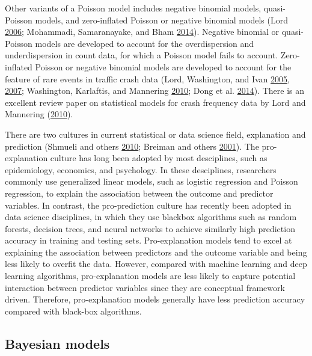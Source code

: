 \documentclass[12pt]{book}
\numberwithin{equation}{chapter}
\begin{document}
Other variants of a Poisson model includes negative binomial models, quasi-Poisson models, and zero-inflated Poisson or negative binomial models (Lord \protect\hyperlink{ref-lord2006modeling}{2006}; Mohammadi, Samaranayake, and Bham \protect\hyperlink{ref-mohammadi2014crash}{2014}). Negative binomial or quasi-Poisson models are developed to account for the overdispersion and underdispersion in count data, for which a Poisson model fails to account. Zero-inflated Poisson or negative binomial models are developed to account for the feature of rare events in traffic crash data (Lord, Washington, and Ivan \protect\hyperlink{ref-lord2005poisson}{2005}, \protect\hyperlink{ref-lord2007further}{2007}; Washington, Karlaftis, and Mannering \protect\hyperlink{ref-washington2010statistical}{2010}; Dong et al. \protect\hyperlink{ref-dong2014multivariate}{2014}). There is an excellent review paper on statistical models for crash frequency data by Lord and Mannering (\protect\hyperlink{ref-lord2010statistical}{2010}).

There are two cultures in current statistical or data science field, explanation and prediction (Shmueli and others \protect\hyperlink{ref-shmueli2010explain}{2010}; Breiman and others \protect\hyperlink{ref-breiman2001statistical}{2001}). The pro-explanation culture has long been adopted by most desciplines, such as epidemiology, economics, and psychology. In these desciplines, researchers commonly use generalized linear models, such as logistic regression and Poisson regression, to explain the association between the outcome and predictor variables. In contrast, the pro-prediction culture has recently been adopted in data science disciplines, in which they use blackbox algorithms such as random forests, decision trees, and neural networks to achieve similarly high prediction accuracy in training and testing sets. Pro-explanation models tend to excel at explaining the association between predictors and the outcome variable and being less likely to overfit the data. However, compared with machine learning and deep learning algorithms, pro-explanation models are less likely to capture potential interaction between predictor variables since they are conceptual framework driven. Therefore, pro-explanation models generally have less prediction accuracy compared with black-box algorithms.

\hypertarget{bayesian-models}{%
\subsection{Bayesian models}\label{bayesian-models}}
\end{document}
